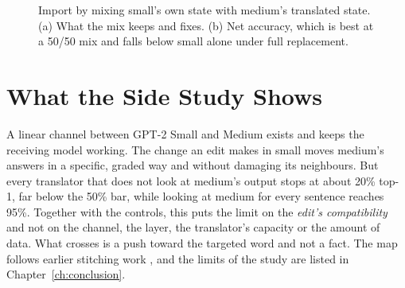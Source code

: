 \begin{figure}[!htb]
\centering
{}
\caption{Import by mixing small's own state with medium's translated state. (a) What the mix keeps and fixes. (b) Net accuracy, which is best at a 50/50 mix and falls below small alone under full replacement.}\label{fig:import}
\end{figure}

\section{What the Side Study Shows}

A linear channel between GPT-2 Small and Medium exists and keeps the receiving model working. The change an edit makes in small moves medium's answers in a specific, graded way and without damaging its neighbours. But every translator that does not look at medium's output stops at about 20\% top-1, far below the 50\% bar, while looking at medium for every sentence reaches 95\%. Together with the controls, this puts the limit on the \emph{edit's compatibility} and not on the channel, the layer, the translator's capacity or the amount of data. What crosses is a push toward the targeted word and not a fact. The map follows earlier stitching work \cite{r44}, and the limits of the study are listed in Chapter~\ref{ch:conclusion}.
